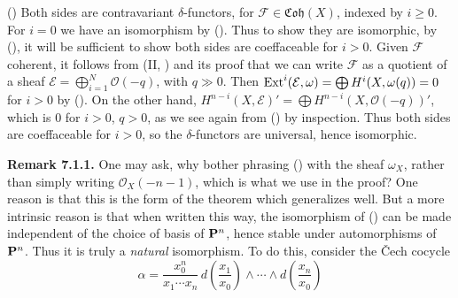 {() Both sides are contravariant $\delta$-functors, for $\mathcal F\in\mathfrak{Coh}(X)$, indexed by $i\ge0$. For $i=0$ we have an isomorphism by (). Thus to show they are isomorphic, by (), it will be sufficient to show both sides are coeffaceable for $i>0$. Given $\mathcal F$ coherent, it follows from (II, ) and its proof that we can write $\mathcal F$ as a quotient of a sheaf $\mathcal E=\bigoplus_{i=1}^N\mathcal O(-q)$, with $q\gg0$. Then $\operatorname{Ext}^i(\mathcal E,\omega)=\bigoplus H^i(X,\omega(q))=0$ for $i>0$ by (). On the other hand, $H^{n-i}(X,\mathcal E)'=\bigoplus H^{n-i}(X,\mathcal O(-q))'$, which is $0$ for $i>0$, $q>0$, as we see again from () by inspection. Thus both sides are coeffaceable for $i>0$, so the $\delta$-functors are universal, hence isomorphic.

\medskip
\noindent\hypertarget{result-III-7.1.1}{}\textbf{Remark 7.1.1.} One may ask, why bother phrasing () with the sheaf $\omega_X$, rather than simply writing $\mathcal O_X(-n-1)$, which is what we use in the proof? One reason is that this is the form of the theorem which generalizes well. But a more intrinsic reason is that when written this way, the isomorphism of () can be made independent of the choice of basis of $\mathbf{P}^n$, hence stable under automorphisms of $\mathbf{P}^n$. Thus it is truly a \emph{natural} isomorphism. To do this, consider the \v Cech cocycle
\[
\alpha=\frac{x_0^n}{x_1\cdots x_n}\,d\left(\frac{x_1}{x_0}\right)\wedge\cdots\wedge d\left(\frac{x_n}{x_0}\right)
\]
}
